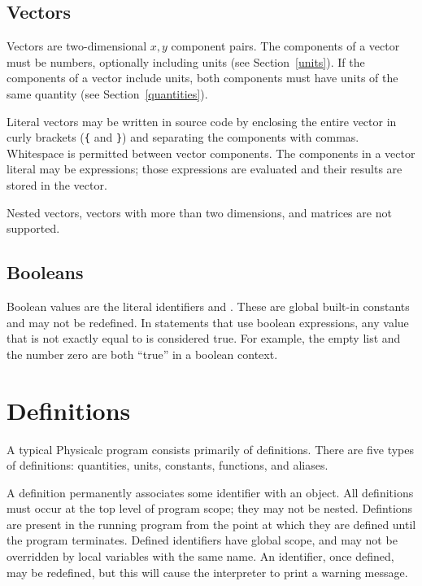 \subsection{Vectors}
\label{vectors}

Vectors are two-dimensional $x,y$ component pairs.  The components of
a vector must be numbers, optionally including units (see
Section~\ref{units}).  If the components of a vector include units,
both components must have units of the same quantity (see
Section~\ref{quantities}).

Literal vectors may be written in source code by enclosing the entire
vector in curly brackets (\verb+{+ and \verb+}+) and separating the
components with commas.  Whitespace is permitted between vector
components.  The components in a vector literal may be expressions;
those expressions are evaluated and their results are stored in the
vector.


Nested vectors, vectors with more than two dimensions, and matrices
are not supported.




\subsection{Booleans}
\label{booleans}

Boolean values are the literal identifiers  and .
These are global built-in constants and may not be redefined.  In
statements that use boolean expressions, any value that is not exactly
equal to  is considered true.  For example, the empty list
and the number zero are both ``true'' in a boolean context.



\section{Definitions}
\label{definitions}

A typical Physicalc program consists primarily of definitions.  There
are five types of definitions: quantities, units, constants,
functions, and aliases.  

A definition permanently associates some identifier with an object.
All definitions must occur at the top level of program scope; they may
not be nested.  Defintions are present in the running program from the
point at which they are defined until the program terminates.  Defined
identifiers have global scope, and may not be overridden by local
variables with the same name.  An identifier, once defined, may be
redefined, but this will cause the interpreter to print a warning
message.


